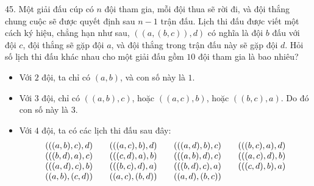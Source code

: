 \begin{problem}{45.}
	Một giải đấu cúp có $n$ đội tham gia, mỗi đội thua sẽ rời đi, và đội thắng chung cuộc sẽ được quyết định sau $n-1$ trận đấu. Lịch thi đấu được viết một cách ký hiệu, chẳng hạn như sau, $((a,(b,c)),d)$ có nghĩa là đội $b$ đấu với đội $c$, đội thắng sẽ gặp đội $a$, và đội thắng trong trận đấu này sẽ gặp đội $d$. Hỏi số lịch thi đấu khác nhau cho một giải đấu gồm $10$ đội tham gia là bao nhiêu?

	\begin{itemize}
		\item Với $2$ đội, ta chỉ có $(a,b)$, và con số này là $1$.
		\item Với $3$ đội, chỉ có $((a,b),c)$, hoặc $ ((a,c),b)$, hoặc $ ((b,c),a)$. Do đó con số này là $3$.
		\item Với $4$ đội, ta có các lịch thi đấu sau đây:
			\begin{equation*}
				\begin{array}{@{}cccc@{}}
					(((a,b),c),d) & \quad\;(((a,c),b),d) & \quad\;(((a,d),b),c) & \quad\;(((b,c),a),d) \\
					(((b,d),a),c) & \quad\;(((c,d),a),b) & \quad\;(((a,b),d),c) & \quad\;(((a,c),d),b) \\
					(((a,d),c),b) & \quad\;(((b,c),d),a) & \quad\;(((b,d),c),a) & \quad\;(((c,d),b),a) \\
					((a,b),(c,d)) & \quad\;((a,c),(b,d)) & \quad\;((a,d),(b,c))
				\end{array}
			\end{equation*}
	\end{itemize}
\end{problem}


